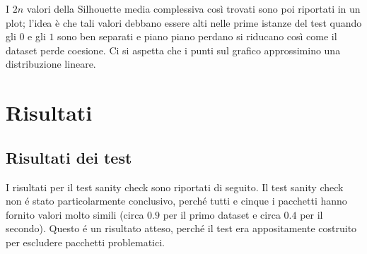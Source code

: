\documentclass[12pt]{report}
\begin{document}
			I $2n$ valori della Silhouette media complessiva così trovati
			sono poi riportati in un plot; l'idea è che tali valori debbano
			essere alti nelle prime istanze del test quando gli $0$ e gli
			$1$ sono ben separati e piano piano perdano si riducano così
			come il dataset perde coesione. Ci si aspetta che i punti sul
			grafico approssimino una distribuzione lineare.


	\chapter{Risultati}

		\section{Risultati dei test}

			I risultati per il test sanity check sono riportati di seguito.
			Il test sanity check non é stato particolarmente conclusivo,
			perché tutti e cinque i pacchetti hanno fornito valori molto
			simili (circa $0.9$ per il primo dataset e circa $0.4$ per il
			secondo). Questo é un risultato atteso, perché il test era
			appositamente costruito per escludere pacchetti problematici.
\end{document}
